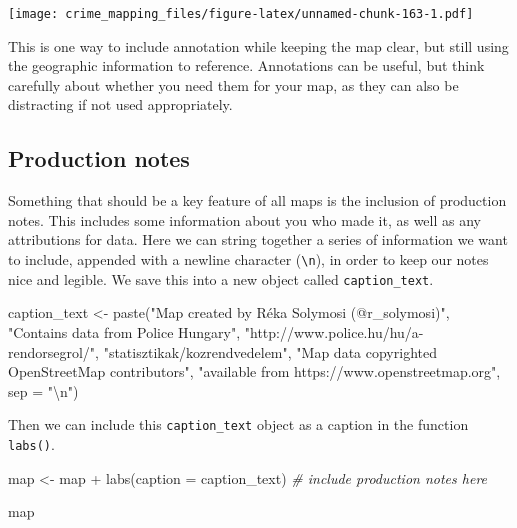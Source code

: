 \documentclass[
  krantz2]{krantz}
\makeatletter
\newenvironment{Shaded}{\begin{snugshade}}{\end{snugshade}}
\newcommand{\AttributeTok}[1]{\textcolor[rgb]{0.61,0.61,0.61}{#1}}
\newcommand{\CommentTok}[1]{\textcolor[rgb]{0.37,0.37,0.37}{\textit{#1}}}
\newcommand{\FunctionTok}[1]{\textcolor[rgb]{0,0,0}{#1}}
\newcommand{\NormalTok}[1]{#1}
\newcommand{\OtherTok}[1]{\textcolor[rgb]{0.37,0.37,0.37}{#1}}
\newcommand{\SpecialCharTok}[1]{\textcolor[rgb]{0,0,0}{#1}}
\newcommand{\StringTok}[1]{\textcolor[rgb]{0.5,0.5,0.5}{#1}}
\newenvironment{kframe}{%
\medskip{}
\setlength{\fboxsep}{.8em}
 \def\at@end@of@kframe{}%
 \ifinner\ifhmode%
  \def\at@end@of@kframe{\end{minipage}}%
  \begin{minipage}{\columnwidth}%
 \fi\fi%
 \def\FrameCommand##1{\hskip\@totalleftmargin \hskip-\fboxsep
 \colorbox{shadecolor}{##1}\hskip-\fboxsep
     \hskip-\linewidth \hskip-\@totalleftmargin \hskip\columnwidth}%
 \MakeFramed {\advance\hsize-\width
   \@totalleftmargin\z@ \linewidth\hsize
   \@setminipage}}%
 {\par\unskip\endMakeFramed%
 \at@end@of@kframe}
\renewenvironment{Shaded}{\begin{kframe}}{\end{kframe}}
\makeatother
\begin{document}
\texttt{[image: crime\_mapping\_files/figure-latex/unnamed-chunk-163-1.pdf]}

This is one way to include annotation while keeping the map clear, but still using the geographic information to reference. Annotations can be useful, but think carefully about whether you need them for your map, as they can also be distracting if not used appropriately.

\hypertarget{production-notes}{%
\subsection{Production notes}\label{production-notes}}

Something that should be a key feature of all maps is the inclusion of production notes. This includes some information about you who made it, as well as any attributions for data. Here we can string together a series of information we want to include, appended with a newline character (\texttt{\textbackslash{}n}), in order to keep our notes nice and legible. We save this into a new object called \texttt{caption\_text}.

\begin{Shaded}
\begin{Highlighting}[]
\NormalTok{caption\_text }\OtherTok{\textless{}{-}} \FunctionTok{paste}\NormalTok{(}\StringTok{"Map created by Réka Solymosi (@r\_solymosi)"}\NormalTok{, }
                       \StringTok{"Contains data from Police Hungary"}\NormalTok{,}
                       \StringTok{"http://www.police.hu/hu/a{-}rendorsegrol/"}\NormalTok{,}
                       \StringTok{"statisztikak/kozrendvedelem"}\NormalTok{, }
                       \StringTok{"Map data copyrighted OpenStreetMap contributors"}\NormalTok{, }
                       \StringTok{"available from https://www.openstreetmap.org"}\NormalTok{, }
                       \AttributeTok{sep =} \StringTok{"}\SpecialCharTok{\textbackslash{}n}\StringTok{"}\NormalTok{)}
\end{Highlighting}
\end{Shaded}

Then we can include this \texttt{caption\_text} object as a caption in the function \texttt{labs()}.

\begin{Shaded}
\begin{Highlighting}[]
\NormalTok{map }\OtherTok{\textless{}{-}}\NormalTok{ map }\SpecialCharTok{+} 
  \FunctionTok{labs}\NormalTok{(}\AttributeTok{caption =}\NormalTok{ caption\_text) }\CommentTok{\# include production notes here}

\NormalTok{map}
\end{Highlighting}
\end{Shaded}
\end{document}
